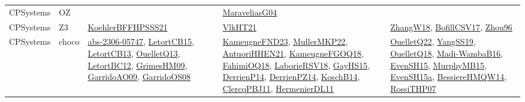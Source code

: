 {\begin{longtable}{llp{6cm}p{6cm}p{6cm}}
CPSystems & OZ &  & \href{papers/MaraveliasG04.pdf}{MaraveliasG04}\cite{MaraveliasG04} & \\
CPSystems & Z3 & \href{articles/KoehlerBFFHPSSS21.pdf}{KoehlerBFFHPSSS21}\cite{KoehlerBFFHPSSS21} & \href{articles/VlkHT21.pdf}{VlkHT21}\cite{VlkHT21} & \href{articles/ZhangW18.pdf}{ZhangW18}\cite{ZhangW18}, \href{papers/BofillCSV17.pdf}{BofillCSV17}\cite{BofillCSV17}, \href{papers/Zhou96.pdf}{Zhou96}\cite{Zhou96}\\
CPSystems & choco & \href{articles/abs-2306-05747.pdf}{abs-2306-05747}\cite{abs-2306-05747}, \href{articles/LetortCB15.pdf}{LetortCB15}\cite{LetortCB15}, \href{papers/LetortCB13.pdf}{LetortCB13}\cite{LetortCB13}, \href{papers/OuelletQ13.pdf}{OuelletQ13}\cite{OuelletQ13}, \href{papers/LetortBC12.pdf}{LetortBC12}\cite{LetortBC12}, \href{papers/GrimesHM09.pdf}{GrimesHM09}\cite{GrimesHM09}, \href{articles/GarridoAO09.pdf}{GarridoAO09}\cite{GarridoAO09}, \href{articles/GarridoOS08.pdf}{GarridoOS08}\cite{GarridoOS08} & \href{papers/KameugneFND23.pdf}{KameugneFND23}\cite{KameugneFND23}, \href{articles/MullerMKP22.pdf}{MullerMKP22}\cite{MullerMKP22}, \href{papers/AntuoriHHEN21.pdf}{AntuoriHHEN21}\cite{AntuoriHHEN21}, \href{papers/KameugneFGOQ18.pdf}{KameugneFGOQ18}\cite{KameugneFGOQ18}, \href{articles/FahimiOQ18.pdf}{FahimiOQ18}\cite{FahimiOQ18}, \href{articles/LaborieRSV18.pdf}{LaborieRSV18}\cite{LaborieRSV18}, \href{papers/GayHS15.pdf}{GayHS15}\cite{GayHS15}, \href{papers/DerrienP14.pdf}{DerrienP14}\cite{DerrienP14}, \href{papers/DerrienPZ14.pdf}{DerrienPZ14}\cite{DerrienPZ14}, \href{papers/KoschB14.pdf}{KoschB14}\cite{KoschB14}, \href{papers/ClercqPBJ11.pdf}{ClercqPBJ11}\cite{ClercqPBJ11}, \href{papers/HermenierDL11.pdf}{HermenierDL11}\cite{HermenierDL11} & \href{papers/OuelletQ22.pdf}{OuelletQ22}\cite{OuelletQ22}, \href{papers/YangSS19.pdf}{YangSS19}\cite{YangSS19}, \href{papers/OuelletQ18.pdf}{OuelletQ18}\cite{OuelletQ18}, \href{papers/Madi-WambaB16.pdf}{Madi-WambaB16}\cite{Madi-WambaB16}, \href{papers/EvenSH15.pdf}{EvenSH15}\cite{EvenSH15}, \href{papers/MurphyMB15.pdf}{MurphyMB15}\cite{MurphyMB15}, \href{articles/EvenSH15a.pdf}{EvenSH15a}\cite{EvenSH15a}, \href{papers/BessiereHMQW14.pdf}{BessiereHMQW14}\cite{BessiereHMQW14}, \href{papers/RossiTHP07.pdf}{RossiTHP07}\cite{RossiTHP07}\\

\end{longtable}}
